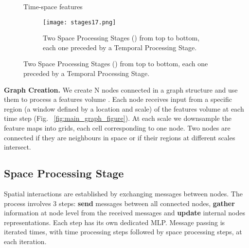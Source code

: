 \documentclass{article}
\begin{document}
\begin{figure}
\begin{minipage}[!tp]{.52\textwidth}
\begin{algorithm}[H]
\begin{algorithmic}\vspace{1mm}
    Time-space features 
\vspace{3mm}
   \REPEAT
    \vspace{-6mm}
    \STATE
    
    \vspace{-4mm}
\vspace{-4mm}
  \STATE
  

   \ENDFOR

   \vspace{-5mm}
    \vspace{2mm}
    \STATE  
\vspace{2mm}
\end{algorithmic}
 \caption{Space-time processing in RSTG model. 
}
   \label{alg:main_model}
\end{algorithm}
\end{minipage}
\begin{minipage}[!tp]{.35\textwidth}
    \begin{figure}[H]
\begin{center}
    \centerline{\texttt{[image: stages17.png]}}
    \caption{ Two Space Processing Stages () from top to bottom, each one preceded by a Temporal Processing Stage. }


    \label{fig:processing_stages}
    \end{center}
    \vskip -0.2in
    \end{figure}

\end{minipage}
\end{figure}

\noindent \textbf{Graph Creation.}  We create N nodes connected in a graph structure and use them to process a features volume . Each node receives input from a specific region (a window defined by a location and scale) of the features volume at each time step  (Fig. ~\ref{fig:main_graph_figure}). At each scale we downsample the  feature maps into  grids, each cell corresponding to one node. Two nodes are connected if they are neighbours in space or if  
their regions at different scales intersect. 

\subsection{Space Processing Stage}
Spatial interactions are established by exchanging messages between nodes. The process involves 3 steps: \textbf{send} messages between all connected nodes, \textbf{gather} information at node level from the received messages and \textbf{update} internal nodes representations. Each step has its own dedicated MLP. Message passing is iterated  times, with time processing steps followed by space processing steps, at each iteration.
\end{document}
